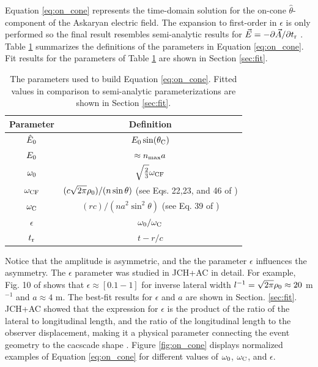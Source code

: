 \documentclass[amsmath,amssymb,aps,prd,10pt,twocolumn]{revtex4}
\begin{document}
Equation \ref{eq:on_cone} represents the time-domain solution for the on-cone $\hat{\theta}$-component of the Askaryan electric field.  The expansion to first-order in $\epsilon$ is only performed so the final result resembles semi-analytic results for $\vec{E} = -\partial\vec{A}/\partial t_{\rm r}$ \cite{10.1103/physrevd.84.103003,PhysRevD.101.083005}. Table \ref{tab:features_1} summarizes the definitions of the parameters in Equation \ref{eq:on_cone}.  Fit results for the parameters of Table \ref{tab:features_1} are shown in Section \ref{sec:fit}.

\begin{table}
\renewcommand{\arraystretch}{1.5}
\begin{tabular}{| c | c |}
\hline
Parameter & Definition \\ \hline
$\hat{E}_{\rm 0}$ & $E_{\rm 0} \sin(\theta_{\rm C})$ \\
$E_{\rm 0}$ & $\approx n_{\rm max}a$ \\
$\omega_{\rm 0}$ & $\sqrt{\frac{2}{3}} \omega_{\rm CF}$ \\
$\omega_{\rm CF}$ & $(c\sqrt{2\pi}\rho_{\rm 0})/(n\sin\theta)$ (see Eqs. 22,23, and 46 of \cite{10.1016/j.astropartphys.2017.03.008}) \\
$\omega_{\rm C}$ & $(rc)/(na^2\sin^2\theta)$ (see Eq. 39 of \cite{10.1016/j.astropartphys.2017.03.008})\\
$\epsilon$ & $\omega_{\rm 0}/\omega_{\rm C}$ \\
$t_{\rm r}$ & $t - r/c$ \\ \hline
\end{tabular}
\caption{\label{tab:features_1} The parameters used to build Equation \ref{eq:on_cone}.  Fitted values in comparison to semi-analytic parameterizations are shown in Section \ref{sec:fit}.}
\end{table} 

Notice that the amplitude is asymmetric, and the the parameter $\epsilon$ influences the asymmetry.  The $\epsilon$ parameter was studied in JCH+AC in detail.  For example, Fig. 10 of \cite{10.1016/j.astropartphys.2017.03.008} shows that $\epsilon \approx [0.1 - 1]$ for inverse lateral width $l^{-1} = \sqrt{2\pi} \rho_{\rm 0} \approx 20$ m$^{-1}$ and $a \approx 4$ m.  The best-fit results for $\epsilon$ and $a$ are shown in Section. \ref{sec:fit}.  JCH+AC showed that the expression for $\epsilon$ is the product of the ratio of the lateral to longitudinal length, and the ratio of the longitudinal length to the observer displacement, making it a physical parameter connecting the event geometry to the cacscade shape \cite{10.1016/j.astropartphys.2017.03.008}.  Figure \ref{fig:on_cone} displays normalized examples of Equation \ref{eq:on_cone} for different values of $\omega_{\rm 0}$, $\omega_{\rm C}$, and $\epsilon$.
\end{document}
